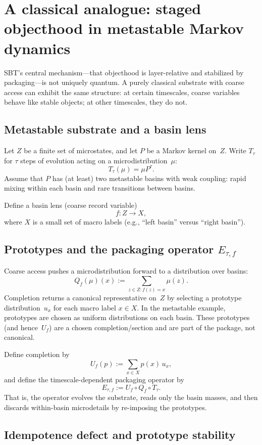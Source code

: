 \section{A classical analogue: staged objecthood in metastable Markov dynamics}\label{sec:markov}

SBT's central mechanism---that objecthood is layer-relative and stabilized by packaging---is not uniquely quantum.
A purely classical substrate with coarse access can exhibit the same structure: at certain timescales, coarse variables behave like stable objects; at other timescales, they do not.

\subsection{Metastable substrate and a basin lens}

Let $Z$ be a finite set of microstates, and let $P$ be a Markov kernel on~$Z$.\cite{Norris1997}
Write $T_\tau$ for $\tau$ steps of evolution acting on a microdistribution~$\mu$:
\[
T_\tau(\mu) = \mu P^\tau.
\]
Assume that $P$ has (at least) two metastable basins with weak coupling: rapid mixing within each basin and rare transitions between basins.

Define a basin lens (coarse record variable)
\[
f : Z \to X,
\]
where $X$ is a small set of macro labels (e.g., ``left basin'' versus ``right basin'').

\subsection{Prototypes and the packaging operator $E_{\tau,f}$}

Coarse access pushes a microdistribution forward to a distribution over basins:
\[
Q_f(\mu)(x) := \sum_{z\in Z: f(z)=x} \mu(z).
\]
Completion returns a canonical representative on~$Z$ by selecting a prototype distribution~$u_x$ for each macro label $x\in X$.
In the metastable example, prototypes are chosen as uniform distributions on each basin.
These prototypes (and hence~$U_f$) are a chosen completion/section and are part of the package, not canonical.

Define completion by
\[
U_f(p) := \sum_{x\in X} p(x)\,u_x,
\]
and define the timescale-dependent packaging operator by
\[
E_{\tau,f} := U_f \circ Q_f \circ T_\tau.
\]
That is, the operator evolves the substrate, reads only the basin masses, and then discards within-basin microdetails by re-imposing the prototypes.

\subsection{Idempotence defect and prototype stability}


